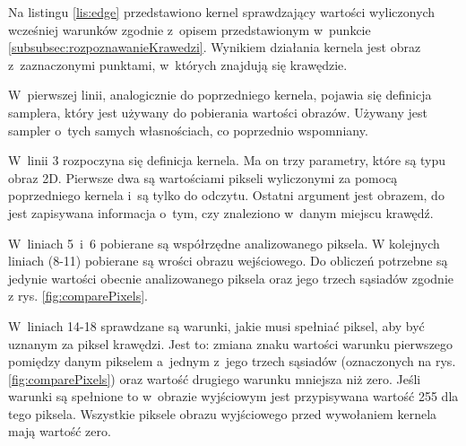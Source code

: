 Na listingu \ref{lis:edge} przedstawiono kernel sprawdzający wartości wyliczonych wcześniej warunków zgodnie z~opisem przedstawionym w~punkcie \ref{subsubsec:rozpoznawanieKrawedzi}. Wynikiem działania kernela jest obraz z~zaznaczonymi punktami, w~których znajdują się krawędzie.

W~pierwszej linii, analogicznie do poprzedniego kernela, pojawia się definicja samplera, który jest używany do pobierania wartości obrazów. Używany jest sampler o~tych samych własnościach, co poprzednio wspomniany.

W~linii 3 rozpoczyna się definicja kernela. Ma on trzy parametry, które są typu obraz 2D. Pierwsze dwa są wartościami pikseli wyliczonymi za pomocą poprzedniego kernela i~są tylko do odczytu. Ostatni argument jest obrazem, do jest zapisywana informacja o~tym, czy znaleziono w~danym miejscu krawędź.

W~liniach 5~i~6 pobierane są współrzędne analizowanego piksela. W kolejnych liniach (8-11) pobierane są wrości obrazu wejściowego. Do obliczeń potrzebne są jedynie wartości obecnie analizowanego piksela oraz jego trzech sąsiadów zgodnie z rys. \ref{fig:comparePixels}.

W~liniach 14-18 sprawdzane są warunki, jakie musi spełniać piksel, aby być uznanym za piksel krawędzi. Jest to: zmiana znaku wartości warunku pierwszego pomiędzy danym pikselem a~jednym z~jego trzech sąsiadów (oznaczonych na rys. \ref{fig:comparePixels}) oraz wartość drugiego warunku mniejsza niż zero. Jeśli warunki są spełnione to w~obrazie wyjściowym jest przypisywana wartość 255 dla tego piksela. Wszystkie piksele obrazu wyjściowego przed wywołaniem kernela mają wartość zero.
